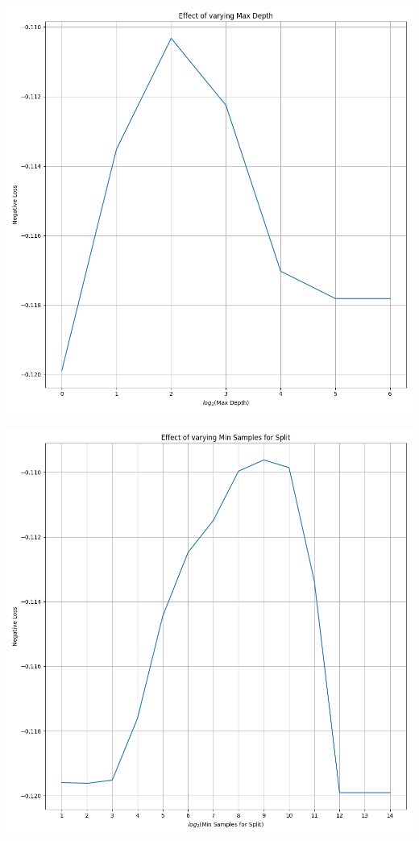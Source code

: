 \documentclass[12pt, letterpaper]{article}
\begin{document}
\includegraphics[scale=\myscale]{decision_tree_regressor_Max Depth.png}

\includegraphics[scale=\myscale]{decision_tree_regressor_Min Samples for Split.png}
\end{document}
